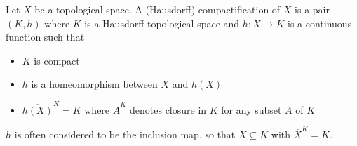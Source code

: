 \documentclass{article}
\begin{document}
Let $X$ be a topological space.  A (Hausdorff) compactification of $X$ is a pair $(K,h)$ where $K$ is a Hausdorff topological space and $h:X\rightarrow K$ is a continuous function such that
\begin{itemize}
\item  $K$ is compact
\item  $h$ is a homeomorphism between $X$ and $h(X)$
\item  $\overline{h(X)}^K=K$ where $\overline{A}^K$ denotes closure in $K$ for any subset $A$ of $K$
\end{itemize}

$h$ is often considered to be the inclusion map, so that $X\subseteq K$ with $\overline{X}^K=K$.
\end{document}
